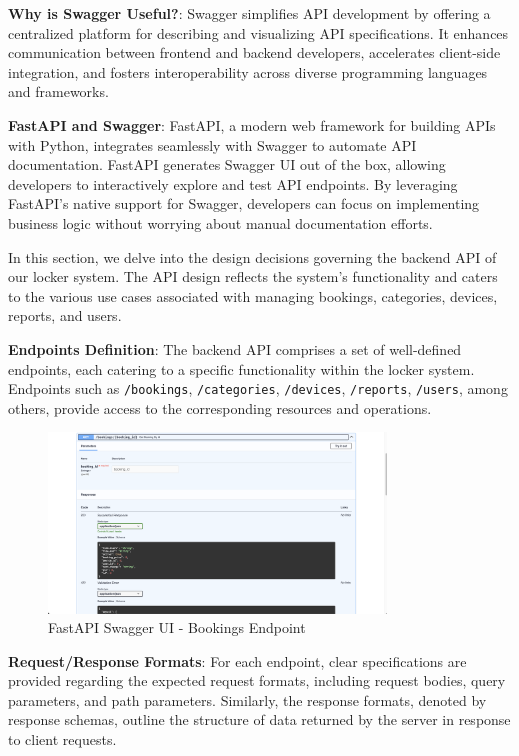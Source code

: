\textbf{Why is Swagger Useful?}:
Swagger simplifies API development by offering a centralized platform for describing and visualizing API specifications. It enhances communication between frontend and backend developers, accelerates client-side integration, and fosters interoperability across diverse programming languages and frameworks.

\textbf{FastAPI and Swagger}:
FastAPI, a modern web framework for building APIs with Python, integrates seamlessly with Swagger to automate API documentation. FastAPI generates Swagger UI out of the box, allowing developers to interactively explore and test API endpoints. By leveraging FastAPI's native support for Swagger, developers can focus on implementing business logic without worrying about manual documentation efforts.


In this section, we delve into the design decisions governing the backend API of our locker system. The API design reflects the system's functionality and caters to the various use cases associated with managing bookings, categories, devices, reports, and users.

\textbf{Endpoints Definition}:
The backend API comprises a set of well-defined endpoints, each catering to a specific functionality within the locker system. Endpoints such as \texttt{/bookings}, \texttt{/categories}, \texttt{/devices}, \texttt{/reports}, \texttt{/users}, among others, provide access to the corresponding resources and operations.

\begin{figure}[h]
    \centering
    \includegraphics[width=0.8\textwidth]{images/swagger_ui_bookings}
    \caption{FastAPI Swagger UI - Bookings Endpoint}
    \label{fig:swagger_ui_bookings}
\end{figure}

\textbf{Request/Response Formats}:
For each endpoint, clear specifications are provided regarding the expected request formats, including request bodies, query parameters, and path parameters. Similarly, the response formats, denoted by response schemas, outline the structure of data returned by the server in response to client requests.

